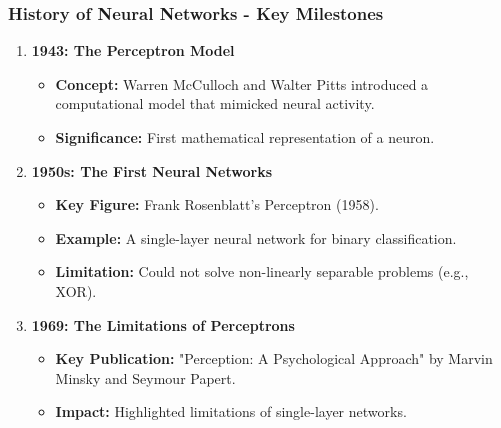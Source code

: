 \documentclass[aspectratio=169]{beamer}
\begin{document}
\begin{frame}[fragile]
    \frametitle{History of Neural Networks - Key Milestones}
    \begin{enumerate}
        \item \textbf{1943: The Perceptron Model}
            \begin{itemize}
                \item \textbf{Concept:} Warren McCulloch and Walter Pitts introduced a computational model that mimicked neural activity.
                \item \textbf{Significance:} First mathematical representation of a neuron.
            \end{itemize}
        
        \item \textbf{1950s: The First Neural Networks}
            \begin{itemize}
                \item \textbf{Key Figure:} Frank Rosenblatt's Perceptron (1958).
                \item \textbf{Example:} A single-layer neural network for binary classification.
                \item \textbf{Limitation:} Could not solve non-linearly separable problems (e.g., XOR).
            \end{itemize}

        \item \textbf{1969: The Limitations of Perceptrons}
            \begin{itemize}
                \item \textbf{Key Publication:} "Perception: A Psychological Approach" by Marvin Minsky and Seymour Papert.
                \item \textbf{Impact:} Highlighted limitations of single-layer networks.
            \end{itemize}
    \end{enumerate}
\end{frame}
\end{document}
